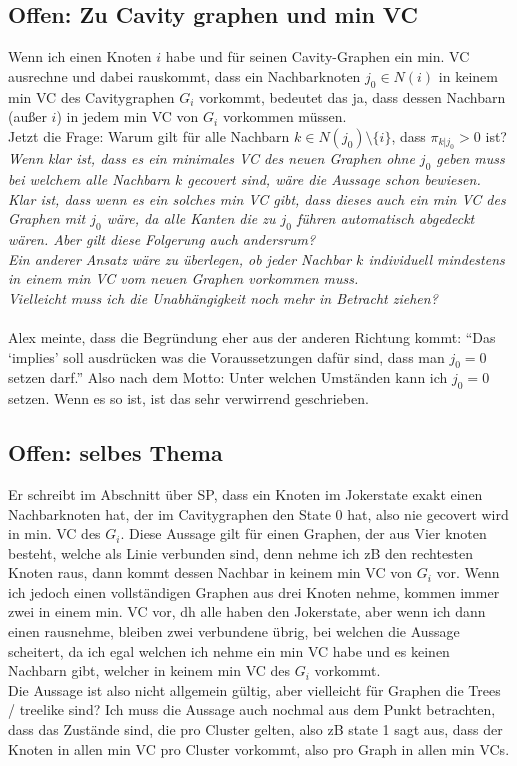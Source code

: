 \documentclass[paper=a4,10pt]{scrartcl}
\begin{document}
\subsection{Offen: Zu Cavity graphen und min VC}
Wenn ich einen Knoten $i$ habe und für seinen Cavity-Graphen ein min. VC ausrechne und dabei rauskommt, dass ein Nachbarknoten $j_0 \in N(i)$ in keinem min VC des Cavitygraphen $G_i$ vorkommt, bedeutet das ja, dass dessen Nachbarn (außer $i$) in jedem min VC von $G_i$ vorkommen müssen.\\
Jetzt die Frage: Warum gilt für alle Nachbarn $k \in N(j_0) \setminus \{i\}$, dass $\pi_{k|j_0} > 0$ ist? \\
\textit{Wenn klar ist, dass es ein minimales VC des neuen Graphen ohne $j_0$ geben muss bei welchem alle Nachbarn $k$ gecovert sind, wäre die Aussage schon bewiesen. Klar ist, dass wenn es ein solches min VC gibt, dass dieses auch ein min VC des Graphen mit $j_0$ wäre, da alle Kanten die zu $j_0$ führen automatisch abgedeckt wären. Aber gilt diese Folgerung auch andersrum?\\
Ein anderer Ansatz wäre zu überlegen, ob jeder Nachbar $k$ individuell mindestens in einem min VC vom neuen Graphen vorkommen muss.\\
Vielleicht muss ich die Unabhängigkeit noch mehr in Betracht ziehen?}\\
\\
Alex meinte, dass die Begründung eher aus der anderen Richtung kommt: ``Das `implies' soll ausdrücken was die Voraussetzungen dafür sind, dass man $j_0=0$ setzen darf.'' Also nach dem Motto: Unter welchen Umständen kann ich $j_0=0$ setzen. Wenn es so ist, ist das sehr verwirrend geschrieben. 

\subsection{Offen: selbes Thema}
Er schreibt im Abschnitt über SP, dass ein Knoten im Jokerstate exakt einen Nachbarknoten hat, der im Cavitygraphen den State 0 hat, also nie gecovert wird in min. VC des $G_i$. Diese Aussage gilt für einen Graphen, der aus Vier knoten besteht, welche als Linie verbunden sind, denn nehme ich zB den rechtesten Knoten raus, dann kommt dessen Nachbar in keinem min VC von $G_i$ vor. Wenn ich jedoch einen vollständigen Graphen aus drei Knoten nehme, kommen immer zwei in einem min. VC vor, dh alle haben den Jokerstate, aber wenn ich dann einen rausnehme, bleiben zwei verbundene übrig, bei welchen die Aussage scheitert, da ich egal welchen ich nehme ein min VC habe und es keinen Nachbarn gibt, welcher in keinem min VC des $G_i$ vorkommt.\\
Die Aussage ist also nicht allgemein gültig, aber vielleicht für Graphen die Trees / treelike sind? 
Ich muss die Aussage auch nochmal aus dem Punkt betrachten, dass das Zustände sind, die pro Cluster gelten, also zB state 1 sagt aus, dass der Knoten in allen min VC pro Cluster vorkommt, also pro Graph in allen min VCs.
\end{document}
